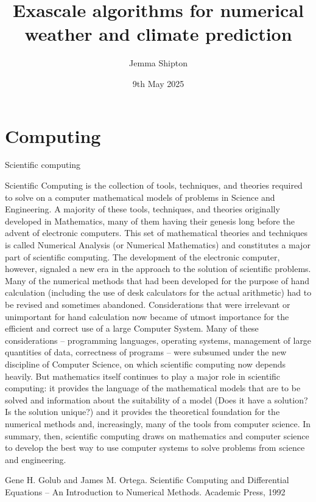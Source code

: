 \documentclass{beamer}
\title{Exascale algorithms for numerical weather and climate prediction}
\author{Jemma Shipton}
\date{9th May 2025}
\begin{document}
\begin{frame}
  \titlepage
\end{frame}

\section{Computing}
\begin{frame}{Scientific computing}
  \begin{exampleblock}{}
     \tiny {Scientific Computing is the collection of tools,
      techniques, and theories required to solve on a computer
      mathematical models of problems in Science and Engineering.  A
      majority of these tools, techniques, and theories originally
      developed in Mathematics, many of them having their genesis long
      before the advent of electronic computers. This set of
      mathematical theories and techniques is called Numerical
      Analysis (or Numerical Mathematics) and constitutes a major part
      of scientific computing. The development of the electronic
      computer, however, signaled a new era in the approach to the
      solution of scientific problems. Many of the numerical methods
      that had been developed for the purpose of hand calculation
      (including the use of desk calculators for the actual
      arithmetic) had to be revised and sometimes
      abandoned. Considerations that were irrelevant or unimportant
      for hand calculation now became of utmost importance for the
      efficient and correct use of a large Computer System. Many of
      these considerations – programming languages, operating systems,
      management of large quantities of data, correctness of programs
      – were subsumed under the new discipline of Computer Science, on
      which scientific computing now depends heavily. But mathematics
      itself continues to play a major role in scientific computing:
      it provides the language of the mathematical models that are to
      be solved and information about the suitability of a model (Does
      it have a solution? Is the solution unique?) and it provides the
      theoretical foundation for the numerical methods and,
      increasingly, many of the tools from computer science.  In
      summary, then, scientific computing draws on mathematics and
      computer science to develop the best way to use computer systems
      to solve problems from science and engineering.}
  \end{exampleblock}
  \small Gene H. Golub and James M. Ortega. Scientific Computing and Differential Equations – An Introduction to Numerical Methods. Academic Press, 1992
\end{frame}
\end{document}
